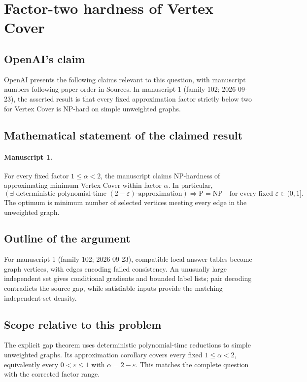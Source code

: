 \documentclass[11pt]{article}
\begin{document}
\section*{Factor-two hardness of Vertex Cover}

\subsection{OpenAI's claim}
OpenAI presents the following claims relevant to this question, with manuscript numbers following paper order in Sources. In manuscript 1 (family 102; 2026-09-23), the asserted result is that every fixed approximation factor strictly below two for Vertex Cover is NP-hard on simple unweighted graphs.

\subsection{Mathematical statement of the claimed result}
\paragraph{Manuscript 1.}
For every fixed factor $1\le\alpha<2$, the manuscript claims NP-hardness of approximating minimum Vertex Cover within factor $\alpha$. In particular,
\[
 (\exists\text{ deterministic polynomial-time }(2-\varepsilon)\text{-approximation})
 \Rightarrow\mathrm P=\mathrm{NP}\quad\text{for every fixed }\varepsilon\in(0,1].
\]
The optimum is minimum number of selected vertices meeting every edge in the unweighted graph.

\subsection{Outline of the argument}
For manuscript 1 (family 102; 2026-09-23), compatible local-answer tables become graph vertices, with edges encoding failed consistency. An unusually large independent set gives conditional gradients and bounded label lists; pair decoding contradicts the source gap, while satisfiable inputs provide the matching independent-set density.

\subsection{Scope relative to this problem}
The explicit gap theorem uses deterministic polynomial-time reductions to simple unweighted graphs. Its approximation corollary covers every fixed $1\le\alpha<2$, equivalently every $0<\varepsilon\le1$ with $\alpha=2-\varepsilon$. This matches the complete question with the corrected factor range.
\end{document}
